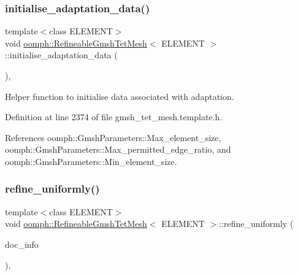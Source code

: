 \subsubsection{\texorpdfstring{initialise\+\_\+adaptation\+\_\+data()}{initialise\_adaptation\_data()}}
{\footnotesize\ttfamily template$<$class E\+L\+E\+M\+E\+NT$>$ \\
void \hyperlink{classoomph_1_1RefineableGmshTetMesh}{oomph\+::\+Refineable\+Gmsh\+Tet\+Mesh}$<$ E\+L\+E\+M\+E\+NT $>$\+::initialise\+\_\+adaptation\+\_\+data (\begin{DoxyParamCaption}{ }\end{DoxyParamCaption})\hspace{0.3cm}{\ttfamily [inline]}, {\ttfamily [protected]}}



Helper function to initialise data associated with adaptation. 



Definition at line 2374 of file gmsh\+\_\+tet\+\_\+mesh.\+template.\+h.



References oomph\+::\+Gmsh\+Parameters\+::\+Max\+\_\+element\+\_\+size, oomph\+::\+Gmsh\+Parameters\+::\+Max\+\_\+permitted\+\_\+edge\+\_\+ratio, and oomph\+::\+Gmsh\+Parameters\+::\+Min\+\_\+element\+\_\+size.

\mbox{\label{classoomph_1_1RefineableGmshTetMesh_a8d71e18a1181d79c475217cfab320674}} 
\subsubsection{\texorpdfstring{refine\+\_\+uniformly()}{refine\_uniformly()}}
{\footnotesize\ttfamily template$<$class E\+L\+E\+M\+E\+NT$>$ \\
void \hyperlink{classoomph_1_1RefineableGmshTetMesh}{oomph\+::\+Refineable\+Gmsh\+Tet\+Mesh}$<$ E\+L\+E\+M\+E\+NT $>$\+::refine\+\_\+uniformly (\begin{DoxyParamCaption}\item[{\hyperlink{classoomph_1_1DocInfo}{Doc\+Info} \&}]{doc\+\_\+info }\end{DoxyParamCaption})\hspace{0.3cm}{\ttfamily [inline]}, {\ttfamily [virtual]}}




